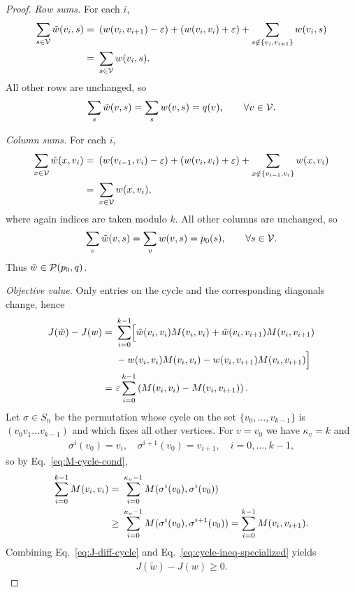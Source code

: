 \begin{proof}
\emph{Row sums.}
For each $i$,
\begin{align*}
    \sum_{s\in\mathcal{V}} \tilde w(v_i,s)
    = &~ \left(w(v_i,v_{i+1})-\varepsilon\right)
       + \left(w(v_i,v_i)+\varepsilon\right)
       + \sum_{s\notin\{v_i,v_{i+1}\}} w(v_i,s)\\
    = &~ \sum_{s\in\mathcal{V}} w(v_i,s).
\end{align*}
All other rows are unchanged, so
\begin{align}
    \sum_{s} \tilde w(v,s) = \sum_s w(v,s) = q(v), \qquad \forall v\in\mathcal{V}.
    \label{eq:rows-preserved}
\end{align}

\emph{Column sums.}
For each $i$,
\begin{align*}
    \sum_{x\in\mathcal{V}} \tilde w(x,v_i)
    = &~ \left(w(v_{i-1},v_i)-\varepsilon\right)
       + \left(w(v_i,v_i)+\varepsilon\right)
       + \sum_{x\notin\{v_{i-1},v_i\}} w(x,v_i)\\
    = &~ \sum_{x\in\mathcal{V}} w(x,v_i),
\end{align*}
where again indices are taken modulo $k$.
All other columns are unchanged, so
\begin{align}
    \sum_v \tilde w(v,s) = \sum_v w(v,s) = p_0(s), \qquad \forall s\in\mathcal{V}.
    \label{eq:cols-preserved}
\end{align}
Thus $\tilde w\in\mathcal{P}(p_0,q)$.

\emph{Objective value.}
Only entries on the cycle and the corresponding diagonals change, hence
\begin{align}
    J(\tilde w)-J(w)
    = &~ \sum_{i=0}^{k-1}
       \Bigl[ \tilde w(v_i,v_i)M(v_i,v_i) + \tilde w(v_i,v_{i+1})M(v_i,v_{i+1}) \\
    &~ - w(v_i,v_i)M(v_i,v_i) - w(v_i,v_{i+1})M(v_i,v_{i+1}) \Bigr] \notag\\
    = &~ \varepsilon \sum_{i=0}^{k-1} \left(M(v_i,v_i) - M(v_i,v_{i+1})\right).
    \label{eq:J-diff-cycle}
\end{align}
Let $\sigma\in S_n$ be the permutation whose cycle on the set
$\{v_0,\dots,v_{k-1}\}$ is $(v_0 v_1 \dots v_{k-1})$ and which fixes all
other vertices.
For $v=v_0$ we have $\kappa_v=k$ and
\begin{align*}
    \sigma^i(v_0) = v_i,\quad
    \sigma^{i+1}(v_0)=v_{i+1},\quad i=0,\dots,k-1,
\end{align*}
so by Eq.~\eqref{eq:M-cycle-cond},
\begin{align}
    \sum_{i=0}^{k-1} M(v_i,v_i)
    = &~ \sum_{i=0}^{\kappa_v-1} M(\sigma^i(v_0),\sigma^i(v_0))
    \notag\\
    \geq &~ \sum_{i=0}^{\kappa_v-1} M(\sigma^i(v_0),\sigma^{i+1}(v_0))
     = \sum_{i=0}^{k-1} M(v_i,v_{i+1}).
    \label{eq:cycle-ineq-specialized}
\end{align}
Combining Eq.~\eqref{eq:J-diff-cycle} and Eq.~\eqref{eq:cycle-ineq-specialized} yields
\begin{align}
    J(\tilde w) - J(w)  \ge  0.
    \label{eq:J-nondecrease-cycle}
\end{align}


\end{proof}
